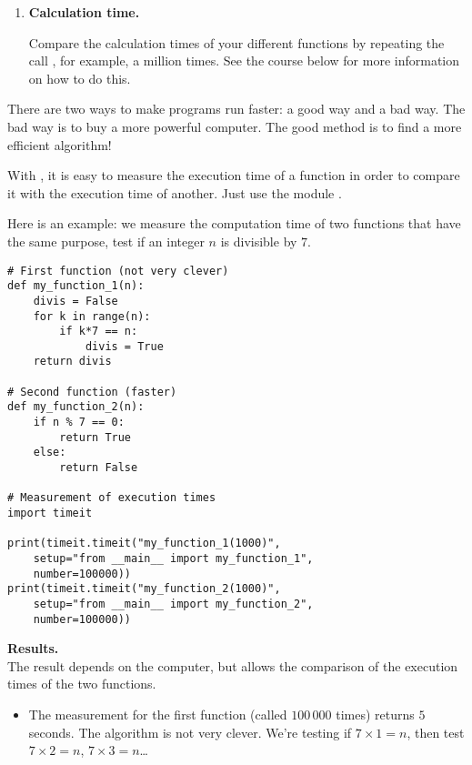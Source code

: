 \documentclass[11pt,class=report,crop=false]{standalone}
\begin{document}
\begin{activite}
\begin{enumerate}
  
  \item \textbf{Calculation time.}
  
  Compare the calculation times of your different functions  by repeating the call , for example, a million times. See the course below for more information on how to do this.
\end{enumerate}   
     
\end{activite}


\begin{cours}

There are two ways to make programs run faster: a good way and a bad way. The bad way is to buy a more powerful computer.
The good method is to find a more efficient algorithm!

With \Python, it is easy to measure the execution time of a function in order to compare it with the execution time of another. Just use the module .


Here is an example: we measure the computation time of two functions that have the same purpose, test if an integer $n$ is divisible by $7$.

\begin{lstlisting}  
# First function (not very clever)
def my_function_1(n):
    divis = False
    for k in range(n):
        if k*7 == n:
            divis = True
    return divis

# Second function (faster)
def my_function_2(n):
    if n % 7 == 0:
        return True
    else:
        return False

# Measurement of execution times
import timeit

print(timeit.timeit("my_function_1(1000)", 
    setup="from __main__ import my_function_1", 
    number=100000))
print(timeit.timeit("my_function_2(1000)", 
    setup="from __main__ import my_function_2", 
    number=100000))
\end{lstlisting} 


\textbf{Results.} \\
The result depends on the computer, but allows the comparison of the execution times of the two functions.
\begin{itemize}
  \item The measurement for the first function (called $100\,000$ times) returns $5$ seconds. The algorithm is not very clever. We're testing
  if $7\times 1 =n$, then test $7\times 2 = n$, $7\times 3 = n$\ldots
  

\end{itemize}
\end{cours}
\end{document}
